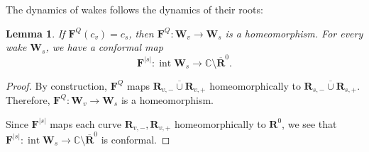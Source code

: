 \documentclass{amsart}
\newcommand{\1}{{\mathbb 1 }}
\newcommand\intr{\operatorname{int}}
\newcommand{\bF}{{\mathbf F}}
\newcommand{\bW}{{\mathbf W}}
\newcommand{\bR}{{\mathbf R}}
\newcommand{\C}{\mathbb{C}}
\newtheorem{lem}[thm]{Lemma}
\theoremstyle{remark}
\numberwithin{equation}{section}
\theoremstyle{definition}
\theoremstyle{nonumberbreak}
\begin{document}
The dynamics of wakes follows the dynamics of their roots:
\begin{lem} If $\bF^Q(c_v)=c_s$, then $\bF^Q\colon \bW_v\to \bW_s$ is a homeomorphism. For every wake $\bW_s$, we have a conformal map \[ \bF^{|s|}\colon \intr \bW_s\to \C\setminus \overline \bR^0.\]
\end{lem}
\begin{proof}
By construction, $\bF^Q$ maps $\overline{\bR_{v,-}\cup \bR_{v,+}}$ homeomorphically to $\overline{\bR_{s,-}\cup \bR_{s,+}}$. Therefore, $\bF^Q\colon \bW_v\to \bW_s$ is a homeomorphism. 

Since $\bF^{|s|}$ maps each curve $\bR_{v,-}, \bR_{v,+}$ homeomorphically to $\bR^0$, we see that  $\bF^{|s|}\colon \intr \bW_s\to \C\setminus \overline \bR^0$ is conformal.
\end{proof}
\end{document}
